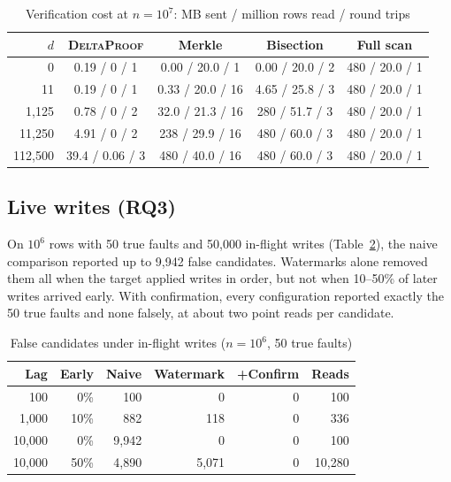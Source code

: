\documentclass[conference]{IEEEtran}
\newcommand{\sys}{\textsc{DeltaProof}}
\begin{document}
\begin{table}[t]
\caption{Verification cost at $n=10^7$: MB sent / million rows read / round trips}
\label{tab:cost}
\centering\footnotesize
\setlength{\tabcolsep}{2.4pt}
\begin{tabular}{@{}rcccc@{}}
\toprule
$d$ & \sys{} & Merkle & Bisection & Full scan\\
\midrule
0 & 0.19 / 0 / 1 & 0.00 / 20.0 / 1 & 0.00 / 20.0 / 2 & 480 / 20.0 / 1\\
11 & 0.19 / 0 / 1 & 0.33 / 20.0 / 16 & 4.65 / 25.8 / 3 & 480 / 20.0 / 1\\
1{,}125 & 0.78 / 0 / 2 & 32.0 / 21.3 / 16 & 280 / 51.7 / 3 & 480 / 20.0 / 1\\
11{,}250 & 4.91 / 0 / 2 & 238 / 29.9 / 16 & 480 / 60.0 / 3 & 480 / 20.0 / 1\\
112{,}500 & 39.4 / 0.06 / 3 & 480 / 40.0 / 16 & 480 / 60.0 / 3 & 480 / 20.0 / 1\\
\bottomrule
\end{tabular}
\end{table}

\subsection{Live writes (RQ3)}
On $10^6$ rows with 50 true faults and 50{,}000 in-flight writes (Table~\ref{tab:live}), the naive comparison reported up to 9{,}942 false candidates. Watermarks alone removed them all when the target applied writes in order, but not when 10--50\% of later writes arrived early. With confirmation, every configuration reported exactly the 50 true faults and none falsely, at about two point reads per candidate.

\begin{table}[t]
\caption{False candidates under in-flight writes ($n=10^6$, 50 true faults)}
\label{tab:live}
\centering\small
\begin{tabular}{@{}rrrrrr@{}}
\toprule
Lag & Early & Naive & Watermark & +Confirm & Reads\\
\midrule
100 & 0\% & 100 & 0 & 0 & 100\\
1{,}000 & 10\% & 882 & 118 & 0 & 336\\
10{,}000 & 0\% & 9{,}942 & 0 & 0 & 100\\
10{,}000 & 50\% & 4{,}890 & 5{,}071 & 0 & 10{,}280\\
\bottomrule
\end{tabular}
\end{table}
\end{document}
